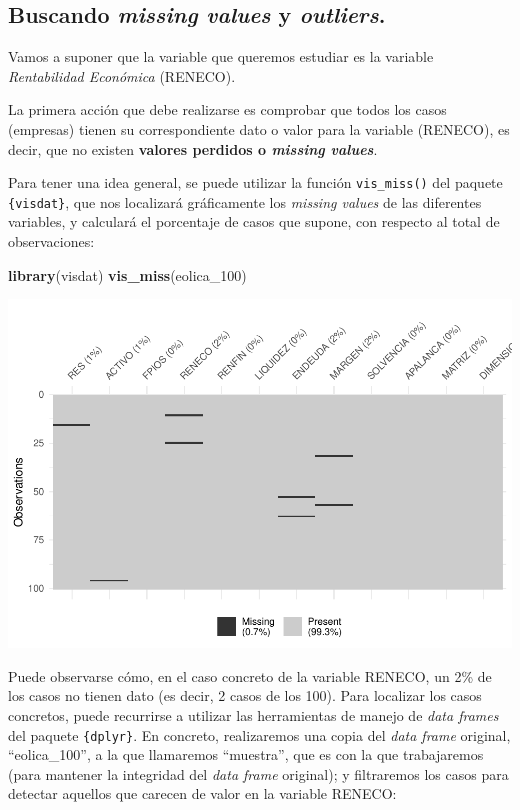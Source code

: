 \documentclass[
]{book}
\newenvironment{Shaded}{\begin{snugshade}}{\end{snugshade}}
\newcommand{\FunctionTok}[1]{\textcolor[rgb]{0.13,0.29,0.53}{\textbf{#1}}}
\newcommand{\NormalTok}[1]{#1}
\let\Oldincludegraphics\includegraphics
\renewcommand{\includegraphics}[2][]{%
  \Oldincludegraphics[#1]{#2}%
}
\begin{document}
\subsection{\texorpdfstring{Buscando \emph{missing values} y \emph{outliers}.}{Buscando missing values y outliers.}}\label{buscando-missing-values-y-outliers.}

Vamos a suponer que la variable que queremos estudiar es la variable \emph{Rentabilidad Económica} (RENECO).

La primera acción que debe realizarse es comprobar que todos los casos (empresas) tienen su correspondiente dato o valor para la variable (RENECO), es decir, que no existen \textbf{valores perdidos o \emph{missing values}}.

Para tener una idea general, se puede utilizar la función \texttt{vis\_miss()} del paquete \texttt{\{visdat\}}, que nos localizará gráficamente los \emph{missing values} de las diferentes variables, y calculará el porcentaje de casos que supone, con respecto al total de observaciones:

\begin{Shaded}
\begin{Highlighting}[]
\FunctionTok{library}\NormalTok{(visdat)}
\FunctionTok{vis\_miss}\NormalTok{(eolica\_100)}
\end{Highlighting}
\end{Shaded}

\includegraphics{_main_files/figure-latex/unnamed-chunk-159-1.pdf}

Puede observarse cómo, en el caso concreto de la variable RENECO, un 2\% de los casos no tienen dato (es decir, 2 casos de los 100). Para localizar los casos concretos, puede recurrirse a utilizar las herramientas de manejo de \emph{data frames} del paquete \texttt{\{dplyr\}}. En concreto, realizaremos una copia del \emph{data frame} original, ``eolica\_100'', a la que llamaremos ``muestra'', que es con la que trabajaremos (para mantener la integridad del \emph{data frame} original); y filtraremos los casos para detectar aquellos que carecen de valor en la variable RENECO:
\end{document}
